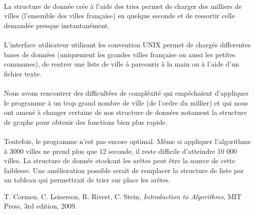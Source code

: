 \documentclass[a4paper]{article}
\begin{document}
\paragraph*{}
La structure de donnée crée à l'aide des tries permet de charger des milliers de villes (l'ensemble des villes française) en quelque seconde et de ressortir celle demandée presque instantanément.
\paragraph*{}
L'interface utilisateur utilisant les convention UNIX permet de chargés differentes bases de données (uniquement les grandes villes française ou aussi les petites communes), de rentrer une liste de ville à parcourir à la main ou à l'aide d'un fichier texte.
\paragraph*{}
Nous avons rencontrer des difficultées de compléxité qui empêchaient d'appliquer le programme à un trop grand nombre de ville (de l'ordre du millier) et qui nous ont amené à changer certaine de nos structure de données notament la structure de graphe pour obtenir des fonctions bien plus rapide.
\paragraph*{}
Toutefois, le programme n'est pas encore optimal. Même si appliquer l'algorithme à 3000 villes ne prend plus que 12 seconde, il reste difficile d'atteindre 10 000 villes. La structure de donnée stockant les arêtes peut être la source de cette faiblesse. Une amélioration possible serait de remplacer la structure de liste par un tableau qui permettrait de trier sur place les arêtes.


\begin{thebibliography}{00}

  T. Cormen, C. Leiserson, R. Rivest, C. Stein,
  \textit{Introduction to Algorithms},
  MIT Press,
  3rd edition,
  2009.
\end{thebibliography}
\end{document}
